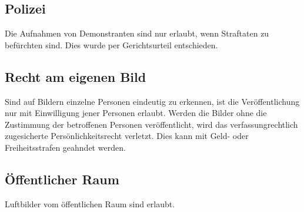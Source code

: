 \documentclass[letterpaper,11pt,ngerman]{andi}
\begin{document}
\subsection{Polizei}
\label{included_projects/rechtliches/RECHTLICHES_SPEC/content:polizei}
Die Aufnahmen von Demonstranten sind nur erlaubt, wenn Straftaten zu befürchten sind. Dies wurde per Gerichtsurteil entschieden. \cite{filmverbot}


\subsection{Recht am eigenen Bild}
\label{included_projects/rechtliches/RECHTLICHES_SPEC/content:recht-am-eigenen-bild}
Sind auf Bildern einzelne Personen eindeutig zu erkennen, ist die Veröffentlichung nur mit Einwilligung jener Personen erlaubt. Werden die Bilder ohne die Zustimmung der betroffenen Personen veröffentlicht, wird das verfassungrechtlich zugesicherte Persönlichkeitsrecht verletzt. Dies kann mit Geld- oder Freiheitsstrafen geahndet werden.


\subsection{Öffentlicher Raum}
\label{included_projects/rechtliches/RECHTLICHES_SPEC/content:offentlicher-raum}
Luftbilder vom öffentlichen Raum sind erlaubt.
\end{document}
